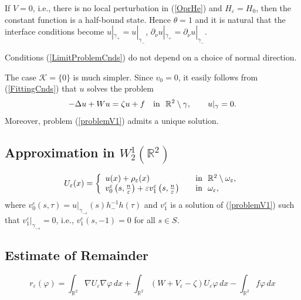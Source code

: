 \documentclass[graybox]{svmult}
\newcommand{\Real}{\mathbb R}
\newcommand{\eps}{\varepsilon}
\renewcommand{\phi}{\varphi}
\newcommand\nep{\textstyle\frac n\eps}
\newcommand{\eqref}[1]{(\ref{#1})}
\begin{document}
\begin{remark}
  If $V=0$, i.e., there is no local perturbation in \eqref{OprHe} and $H_\eps=H_0$, then the constant function is a half-bound state. Hence $\theta=1$ and it is natural that the interface conditions become
$u|_{\gamma_+}= u|_{\gamma_-}$, $\partial_\nu u|_{\gamma_+}=\partial_\nu u|_{\gamma_-}$.
\end{remark}
\begin{remark}
  Conditions \eqref{LimitProblemCnds} do not depend on a choice of normal direction.
\end{remark}


The case $\mathcal{K}=\{0\}$ is much simpler.  Since $v_0=0$, it easily follows from \eqref{FittingCnds} that $u$ solves the problem
\begin{equation}
-\Delta u+Wu=\zeta u+f \quad \hbox{in \ } \Real^2\setminus \gamma,\qquad
 u|_{\gamma}=0.
\end{equation}
Moreover, problem \eqref{problemV1} admits a unique solution.





\subsection{Approximation in $W_2^1(\Real^2)$}


\begin{equation}\label{AsymptoticsUe}
U_\eps(x)=
\left\{
  \begin{array}{ll}
    u(x)+\rho_\eps(x)&\quad \hbox{in \ }\Real^2\setminus \omega_\eps, \\
    v_0^\eps\left(s,\nep\right)+\eps v_1^\eps\left(s,\nep\right)
&\quad \hbox{in \ } \omega_\eps,
  \end{array}
\right.
\end{equation}
where $v_0^\eps\left(s,\tau\right)=u|_{\gamma_{-\eps}}(s)h_-^{-1}h(\tau)$
and $v_1^\eps$ is a solution of \eqref{problemV1} such that
$v_1^\eps|_{\gamma_{-\eps}}=0$, i.e., $v_1^\eps(s,-1)=0$ for all $s\in S$.











\subsection{Estimate of Remainder}


$$
r_\eps(\phi)=\int_{\Real^2}\nabla U_\eps \nabla \phi\,dx+
             \int_{\Real^2} (W+V_\eps-\zeta)U_\eps \phi\,dx
            -   \int_{\Real^2}f\phi\,dx
$$
\end{document}
